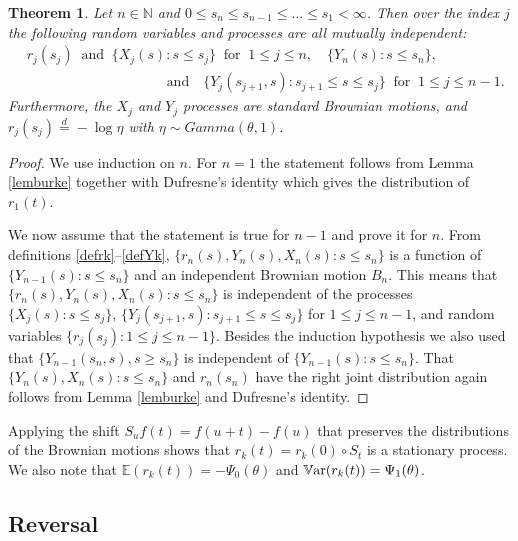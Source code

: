 \documentclass[11pt]{amsart}
\newtheorem{theorem}{\sc Theorem}[section]
\numberwithin{equation}{section}
\theoremstyle{remark}
\begin{document}
\begin{theorem}\label{burkethm}
Let $n\in{\mathbb{N}}$ and  $0\le s_n\le s_{n-1}\le\dots\le s_1<\infty$. 
Then over the index $j$ 
 the following random variables and processes are all mutually independent:
 \begin{align*}
& r_j(s_j) \ \text{ and } \    \{X_j(s): s\le s_j\} \ \text{ for } \    1\le j\le n, \quad  \{Y_n(s): s\le s_n\}, \quad \\
& \qquad\qquad\qquad\qquad\qquad   \text{and} \quad
\{Y_j(s_{j+1},s): s_{j+1}\le s\le s_j\} \ \text{ for } \    1\le j\le n-1.
 \end{align*}
Furthermore,  the $X_j$ and $Y_j$  processes are standard Brownian motions,  and $r_j(s_j)\overset{d}=-\log \eta$ with $\eta\sim Gamma({\theta},1)$. 
\end{theorem}
\begin{proof}
We use induction on $n$.   For $n=1$ the statement follows from Lemma \ref{lemburke} together with Dufresne's identity \cite[Cor.~4]{dufr-osaka01} which gives the distribution of $r_1(t)$.

We now assume that the statement is true for $n-1$ and prove it for $n$. From definitions \eqref{defrk}--\eqref{defYk},  
$\{r_{n}(s), Y_{n}(s), X_n(s): s\le s_n\}$ is a function of 
 $\{Y_{n-1}(s): s\le s_{n}\}$ and an
independent Brownian motion $B_{n}$. This means that $\{r_{n}(s), Y_{n}(s), X_n(s): s\le s_n\}$ is independent of  the processes $\{X_j(s): s\le s_j\}$, $\{Y_j(s_{j+1},s): s_{j+1}\le  s\le s_j\}$
for  $1\le j\le n-1$, and random variables $\{r_j(s_j): 1\le j \le n-1\}$.
 Besides the induction hypothesis we also used that $\{Y_{n-1}(s_{n},s), s\ge s_{n}\}$ is independent of  $\{Y_{n-1}(s): s\le s_{n}\}$. That $\{ Y_{n}(s), X_n(s): s\le s_n\}$ and $ r_{n}(s_n)$ have the right joint distribution again follows from Lemma \ref{lemburke} and Dufresne's identity.
\end{proof}
Applying the shift ${S}_uf(t)=f(u+t)-f(u)$ that preserves
the distributions of the  Brownian motions 
shows that  $r_k(t)=r_k(0)\circ{S}_t$ is a stationary process. {We also note that ${\mathbb{E}} (r_k(t))=-{\Psi_0}({\theta})$ and ${{\rm\mathbb{V}ar}} (r_k(t))={\Psi_1}({\theta})$.}
\subsection{Reversal}
\end{document}
